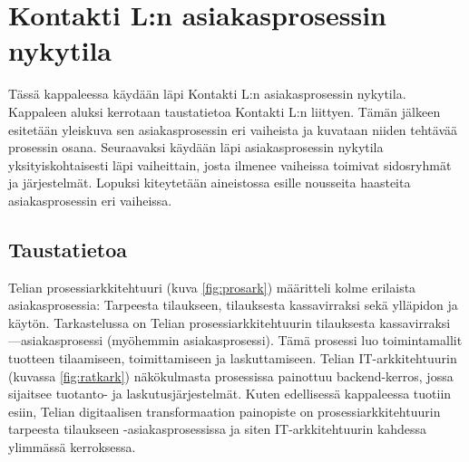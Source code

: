 \documentclass[finnish,12pt,a4paper,pdftex]{article}
\begin{document}
\section{Kontakti L:n asiakasprosessin nykytila}

Tässä kappaleessa käydään läpi Kontakti L:n asiakasprosessin nykytila. Kappaleen aluksi kerrotaan taustatietoa Kontakti L:n liittyen. Tämän jälkeen esitetään yleiskuva sen asiakasprosessin eri vaiheista ja kuvataan niiden tehtävää prosessin osana. Seuraavaksi käydään läpi asiakasprosessin nykytila yksityiskohtaisesti läpi vaiheittain, josta ilmenee vaiheissa toimivat sidosryhmät ja järjestelmät. Lopuksi kiteytetään aineistossa esille nousseita haasteita asiakasprosessin eri vaiheissa.











\subsection{Taustatietoa}

Telian prosessiarkkitehtuuri (kuva \ref{fig:prosark}) määritteli kolme erilaista asiakasprosessia: Tarpeesta tilaukseen, tilauksesta kassavirraksi sekä ylläpidon ja käytön. Tarkastelussa on Telian prosessiarkkitehtuurin tilauksesta kassavirraksi —asiakasprosessi (myöhemmin asiakasprosessi). Tämä prosessi luo toimintamallit tuotteen tilaamiseen, toimittamiseen ja laskuttamiseen. Telian IT-arkkitehtuurin (kuvassa \ref{fig:ratkark}) näkökulmasta prosessissa painottuu backend-kerros, jossa sijaitsee tuotanto- ja laskutusjärjestelmät. Kuten edellisessä kappaleessa tuotiin esiin, Telian digitaalisen transformaation painopiste on prosessiarkkitehtuurin tarpeesta tilaukseen -asiakasprosessissa ja siten IT-arkkitehtuurin kahdessa ylimmässä kerroksessa. \\
\end{document}

